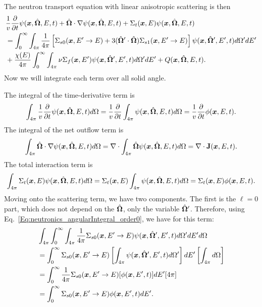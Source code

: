 The neutron transport equation with linear anisotropic scattering is then
\begin{align}
  &\frac{1}{v} \frac{ \partial {} }{ \partial {t} } \psi(\bm{x},\hat{\mathbf{\Omega}},E,t) + \hat{\mathbf{\Omega}} \cdot \nabla \psi(\bm{x},\hat{\mathbf{\Omega}},E,t) + \Sigma_t(\bm{x},E) \psi(\bm{x},\hat{\mathbf{\Omega}},E,t) \nonumber \\*
  &= \int_0^\infty \int_{4\pi}  \frac{1}{4\pi} \left[ \Sigma_{s0} (\bm{x}, E' \rightarrow E ) + 3 ( \hat{\mathbf{\Omega}}' \cdot \hat{\mathbf{\Omega}} )  \Sigma_{s1} (\bm{x}, E' \rightarrow E ) \right] \psi(\bm{x},\hat{\mathbf{\Omega}}',E',t) d\Omega' dE' \nonumber \\*
  &+ \frac{\chi(E)}{4\pi} \int_0^\infty \int_{4\pi}  \nu \Sigma_f(\bm{x},E')  \psi(\bm{x},\hat{\mathbf{\Omega}}',E',t) d\Omega' dE' + Q(\bm{x},\hat{\mathbf{\Omega}},E,t) .
\end{align}
Now we will integrate each term over all solid angle.

The integral of the time-derivative term is
\begin{align}
  \int_{4\pi} \frac{1}{v} \frac{ \partial {} }{ \partial {t} } \psi(\bm{x},\hat{\mathbf{\Omega}},E,t) d\Omega = \frac{1}{v} \frac{ \partial {} }{ \partial {t} } \int_{4\pi} \psi(\bm{x},\hat{\mathbf{\Omega}},E,t) d\Omega = \frac{1}{v} \frac{ \partial {} }{ \partial {t} } \phi(\bm{x},E,t) . \nonumber
\end{align}
The integral of the net outflow term is
\begin{align}
  \int_{4\pi} \hat{\mathbf{\Omega}} \cdot \nabla \psi(\bm{x},\hat{\mathbf{\Omega}},E,t) d\Omega = \nabla \cdot  \int_{4\pi} \hat{\mathbf{\Omega}} \psi(\bm{x},\hat{\mathbf{\Omega}},E,t) d\Omega =  \nabla \cdot \mathbf{J}(\bm{x},E,t) . \nonumber
\end{align}
The total interaction term is
\begin{align}
  \int_{4\pi} \Sigma_t(\bm{x},E) \psi(\bm{x},\hat{\mathbf{\Omega}},E,t) d\Omega = \Sigma_t(\bm{x},E)  \int_{4\pi} \psi(\bm{x},\hat{\mathbf{\Omega}},E,t) d\Omega = \Sigma_t(\bm{x},E) \phi(\bm{x},E,t) . \nonumber
\end{align}
Moving onto the scattering term, we have two components. The first is the $\ell = 0$ part, which does not depend on the $\hat{\mathbf{\Omega}}$, only the variable $\hat{\mathbf{\Omega}}'$. Therefore, using Eq.~\eqref{Eq:neutronics_angularIntegral_order0}, we have for this term:
\begin{align}
  &\int_{4\pi} \int_0^\infty \int_{4\pi}  \frac{1}{4\pi} \Sigma_{s0}(\bm{x}, E' \rightarrow E )  \psi(\bm{x},\hat{\mathbf{\Omega}}',E',t) d\Omega' dE' d\Omega \nonumber \\
  &= \int_0^\infty \Sigma_{s0}(\bm{x}, E' \rightarrow E ) \left[ \int_{4\pi}  \psi(\bm{x},\hat{\mathbf{\Omega}}',E',t) d\Omega' \right] dE' \left[ \int_{4\pi} d\Omega \right] \nonumber \\
  &= \int_0^\infty \frac{1}{4\pi} \Sigma_{s0}(\bm{x}, E' \rightarrow E ) [ \phi(\bm{x},E',t) ] dE'  [4\pi ] \nonumber \\
  &= \int_0^\infty \Sigma_{s0}(\bm{x}, E' \rightarrow E ) \phi(\bm{x},E',t) dE' . \nonumber
\end{align}
